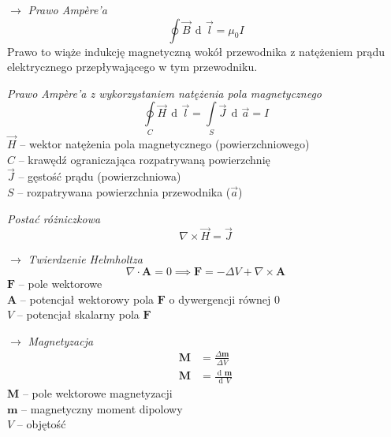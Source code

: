 \documentclass[12pt]{article}
\newenvironment{wzor}[1]{\par{\Large $\longrightarrow$ \textit{#1}}}
    {\newline {\color{grey} \rule{\linewidth}{0.3pt}}}
\DeclareMathOperator{\der}{\operatorname{d}\!}
\begin{document}
\begin{wzor}{Prawo Ampère'a}
    \begin{equation}
        \oint \Vec{B} \, \der\Vec{l} = \mu_0 I
    \end{equation}
    Prawo to wiąże indukcję magnetyczną wokół przewodnika z natężeniem prądu elektrycznego
    przepływającego w tym przewodniku.
    
    \newpage
    
    \par \textit{Prawo Ampère'a z wykorzystaniem natężenia pola magnetycznego}
    \begin{equation}
        \oint\limits_C \Vec{H} \, \der\Vec{l} = \int\limits_S \Vec{J} \, \der\Vec{a} = I
    \end{equation}
    $\Vec{H}$ -- wektor natężenia pola magnetycznego (powierzchniowego)\\
    $C$ -- krawędź ograniczająca rozpatrywaną powierzchnię\\
    $\Vec{J}$ -- gęstość prądu (powierzchniowa)\\
    $S$ -- rozpatrywana powierzchnia przewodnika ($\Vec{a}$)
    
    \par \textit{Postać różniczkowa}
    \begin{equation}
        \nabla \times \Vec{H} = \Vec{J}
    \end{equation}
\end{wzor}

\begin{wzor}{Twierdzenie Helmholtza}
    \begin{equation}
        \nabla \cdot \mathbf{A} = 0 \implies \mathbf{F} = - \Delta V + \nabla \times \mathbf{A}
    \end{equation}
    $\mathbf{F}$ -- pole wektorowe\\
    $\mathbf{A}$ -- potencjał wektorowy pola $\mathbf{F}$ o dywergencji równej 0\\
    $V$ -- potencjał skalarny pola $\mathbf{F}$
\end{wzor}

\begin{wzor}{Magnetyzacja}
    \begin{equation}
        \begin{split}
            \mathbf{M} &= \frac{\Delta \mathbf{m}}{\Delta V}\\
            \mathbf{M} &= \frac{\der \mathbf{m}}{\der V}
        \end{split}
    \end{equation}
    $\mathbf{M}$ -- pole wektorowe magnetyzacji\\
    $\mathbf{m}$ -- magnetyczny moment dipolowy\\
    $V$ -- objętość
\end{wzor}
\end{document}
